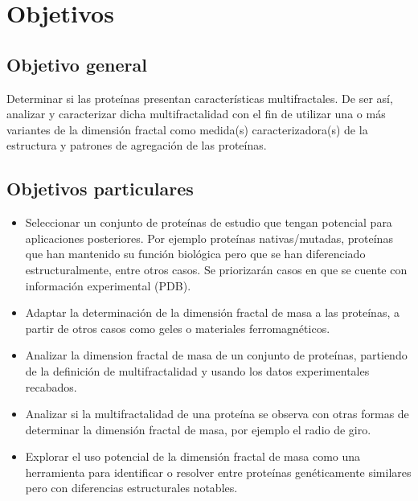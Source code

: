 \documentclass[11pt]{article}
\begin{document}
\section{Objetivos}
\subsection{Objetivo general}

Determinar si las proteínas presentan características multifractales. De ser así, analizar y caracterizar
dicha multifractalidad con el fin de utilizar una o más variantes de la
dimensión fractal como medida(s) caracterizadora(s)
de la estructura y patrones de agregación de las proteínas.


\subsection{Objetivos particulares}

\begin{itemize}

\item Seleccionar un conjunto de proteínas de estudio que tengan potencial para aplicaciones posteriores.
Por ejemplo proteínas nativas/mutadas, proteínas que han mantenido su función biológica pero que se
han diferenciado estructuralmente, entre otros casos. Se priorizarán casos en que se cuente con información
experimental (PDB).

\item Adaptar la determinación de la dimensión fractal de masa a las proteínas, a partir de otros casos como geles o materiales ferromagnéticos.

\item Analizar la dimension fractal de masa de un conjunto de proteínas, partiendo de la definición de multifractalidad y usando los datos experimentales recabados.

\item Analizar si la multifractalidad de una proteína se observa con otras formas de determinar la
dimensión fractal de masa, por ejemplo el radio de giro.

\item Explorar el uso potencial de la dimensión fractal de masa como una herramienta para identificar
o resolver entre proteínas genéticamente similares pero con diferencias estructurales notables.

\end{itemize}

\clearpage
\end{document}
